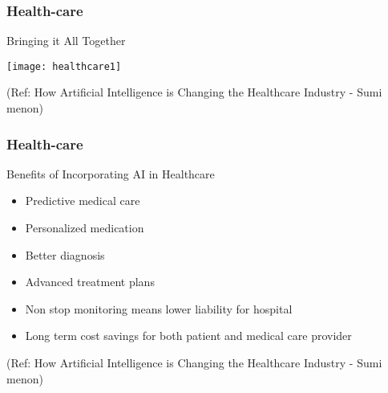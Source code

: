 \begin{frame}[fragile]\frametitle{Health-care}
Bringing it All Together

\begin{center}
\texttt{[image: healthcare1]}
\end{center}

{\tiny (Ref: How Artificial Intelligence is Changing the Healthcare Industry - Sumi menon)}
\end{frame}

\begin{frame}[fragile]\frametitle{Health-care}
Benefits of Incorporating AI in Healthcare
\begin{itemize}
\item Predictive medical care
\item Personalized medication
\item Better diagnosis
\item Advanced treatment plans
\item Non stop monitoring means lower liability for hospital
\item Long term cost savings for both patient and medical care provider
\end{itemize}

{\tiny (Ref: How Artificial Intelligence is Changing the Healthcare Industry - Sumi menon)}
\end{frame}